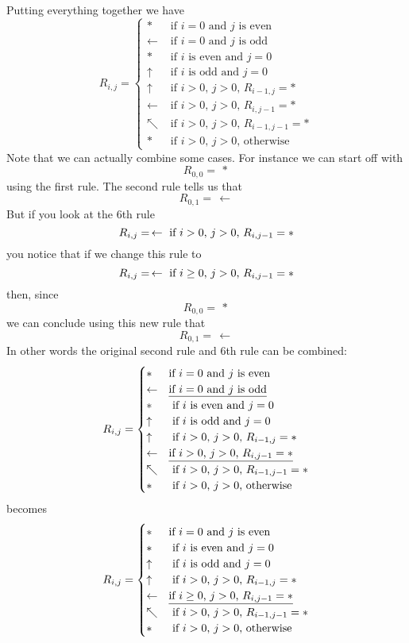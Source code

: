 Putting everything together we have
\[
R_{i,j} =
\begin{cases}
*           & \text{ if $i = 0$ and $j$ is even} \\
\leftarrow  & \text{ if $i = 0$ and $j$ is odd}  \\ 
*           & \text{ if $i$ is even and $j = 0$} \\
\uparrow    & \text{ if $i$ is odd and $j = 0$}  \\ 
\uparrow    & \text{ if $i>0$, $j>0$, $R_{i-1,j} = *$} \\
\leftarrow  & \text{ if $i>0$, $j>0$, $R_{i,j-1} = *$} \\
\nwarrow    & \text{ if $i>0$, $j>0$, $R_{i-1,j-1} = *$} \\
*           & \text{ if $i>0$, $j>0$, otherwise}
\end{cases}
\]
Note that we can actually combine some cases.
For instance we can start off with
\[
R_{0,0} = \, *
\]
using the first rule.
The second rule tells us that
\[
R_{0,1} = \, \leftarrow
\]
But if you look at the 6th rule
\[
  R_{i,j} = \, \leftarrow \text{ if $i>0$, $j>0$, $R_{i,j-1} = *$} \\
\]
you notice that if we change this rule to
\[
  R_{i,j} = \, \leftarrow \text{ if $i \geq 0$, $j>0$, $R_{i,j-1} = *$} \\
\]
then, since 
\[
R_{0,0} = \, *
\]
we can conclude using this new rule that
\[
R_{0,1} = \, \leftarrow
\]
In other words the original second rule and 6th rule can be combined:
\[
R_{i,j} =
\begin{cases}
*           & \text{if $i = 0$ and $j$ is even} \\
\leftarrow  & \text{\underline{if $i = 0$ and $j$ is odd}}  \\ 
*           & \text{ if $i$ is even and $j = 0$} \\
\uparrow    & \text{ if $i$ is odd and $j = 0$}  \\ 
\uparrow    & \text{ if $i>0$, $j>0$, $R_{i-1,j} = *$} \\
\leftarrow  & \text{\underline{if $i>0$, $j>0$, $R_{i,j-1} = *$}} \\
\nwarrow    & \text{ if $i>0$, $j>0$, $R_{i-1,j-1} = *$} \\
*           & \text{ if $i>0$, $j>0$, otherwise}
\end{cases}
\]
becomes
\[
R_{i,j} =
\begin{cases}
*           & \text{if $i = 0$ and $j$ is even} \\
*           & \text{ if $i$ is even and $j = 0$} \\
\uparrow    & \text{ if $i$ is odd and $j = 0$}  \\ 
\uparrow    & \text{ if $i>0$, $j>0$, $R_{i-1,j} = *$} \\
\leftarrow  & \text{\underline{if $i \geq 0$, $j>0$, $R_{i,j-1} = *$}} \\
\nwarrow    & \text{ if $i>0$, $j>0$, $R_{i-1,j-1} = *$} \\
*           & \text{ if $i>0$, $j>0$, otherwise}
\end{cases}
\]
